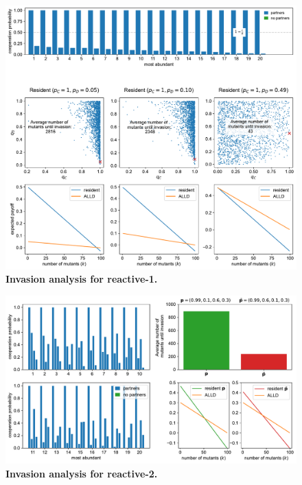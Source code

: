 \documentclass[11pt]{article}
\theoremstyle{plainCl1}
\theoremstyle{plainCl2}
\begin{document}
\begin{figure}[tbhp]
  \centering
  \includegraphics[width=\textwidth]{../../figures/siFigInvasionR1.pdf}
  \caption{\textbf{Invasion analysis for reactive-1.}
  }
\end{figure}

\begin{figure}[tbhp]
  \centering
  \includegraphics[width=\textwidth]{../../figures/siFigInvasionR2.pdf}
  \caption{\textbf{Invasion analysis for reactive-2.}
  }
\end{figure}
\end{document}

